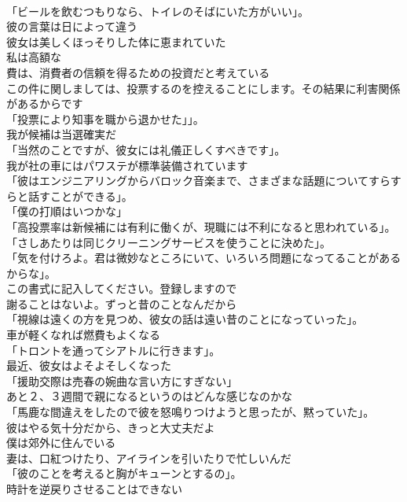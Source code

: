 \documentclass[8pt]{extreport}
\begin{document}
\begin{CJK}{UTF8}{min}
\\	「ビールを飲むつもりなら、トイレのそばにいた方がいい」。	
\\	彼の言葉は日によって違う	
\\	彼女は美しくほっそりした体に恵まれていた	
\\	私は高額な
\\	費は、消費者の信頼を得るための投資だと考えている	
\\	この件に関しましては、投票するのを控えることにします。その結果に利害関係があるからです	
\\	「投票により知事を職から退かせた」」。	
\\	我が候補は当選確実だ	
\\	「当然のことですが、彼女には礼儀正しくすべきです」。	
\\	我が社の車にはパワステが標準装備されています	
\\	「彼はエンジニアリングからバロック音楽まで、さまざまな話題についてすらすらと話すことができる」。	
\\	「僕の打順はいつかな」	
\\	「高投票率は新候補には有利に働くが、現職には不利になると思われている」。	
\\	「さしあたりは同じクリーニングサービスを使うことに決めた」。	
\\	「気を付けろよ。君は微妙なところにいて、いろいろ問題になってることがあるからな」。	
\\	この書式に記入してください。登録しますので	
\\	謝ることはないよ。ずっと昔のことなんだから	
\\	「視線は遠くの方を見つめ、彼女の話は遠い昔のことになっていった」。	
\\	車が軽くなれば燃費もよくなる	
\\	「トロントを通ってシアトルに行きます」。	
\\	最近、彼女はよそよそしくなった	
\\	「援助交際は売春の婉曲な言い方にすぎない」	
\\	あと２、３週間で親になるというのはどんな感じなのかな	
\\	「馬鹿な間違えをしたので彼を怒鳴りつけようと思ったが、黙っていた」。	
\\	彼はやる気十分だから、きっと大丈夫だよ	
\\	僕は郊外に住んでいる	
\\	妻は、口紅つけたり、アイラインを引いたりで忙しいんだ	
\\	「彼のことを考えると胸がキューンとするの」。	
\\	時計を逆戻りさせることはできない	

\end{CJK}
\end{document}
